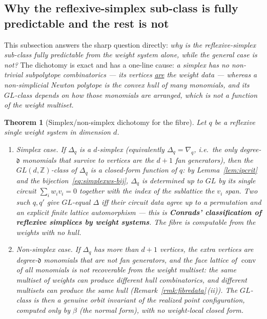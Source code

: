 \documentclass{amsart}
\newtheorem{theorem}{Theorem}[section]
\begin{document}
\subsection{Why the reflexive-simplex sub-class is fully predictable and
the rest is not}\label{sec:fibre-dichotomy}

This subsection answers the sharp question directly: \emph{why is the
reflexive-simplex sub-class fully predictable from the weight system alone,
while the general case is not?} The dichotomy is exact and has a one-line cause:
\emph{a simplex has no non-trivial subpolytope combinatorics --- its vertices
\underline{are} the weight data --- whereas a non-simplicial Newton polytope is
the convex hull of many monomials, and its $GL$-class depends on how those
monomials are arranged, which is not a function of the weight multiset.}

\begin{theorem}[Simplex/non-simplex dichotomy for the fibre]
\label{thm:dichotomy}
Let $q$ be a reflexive single weight system in dimension $d$.
\begin{enumerate}
  \item[\textnormal{(S)}] \emph{Simplex case.} If $\Delta_q$ is a $d$-simplex
        (equivalently $\Delta_q=\nabla_q$, i.e.\ the only degree-$\mathfrak d$
        monomials that survive to vertices are the $d{+}1$ fan generators), then
        the $GL(d,\mathbb Z)$-class of $\Delta_q$ is a \emph{closed-form
        function of $q$}: by Lemma~\ref{lem:ipcrit} and the
        bijection~\eqref{eq:simplexws-bij}, $\Delta_q$ is determined up to $GL$
        by its single circuit $\sum_i w_i v_i=0$ together with the index of the
        sublattice the $v_i$ span. Two such $q,q'$ give $GL$-equal $\Delta$ iff
        their circuit data agree up to a permutation and an explicit finite
        lattice automorphism --- this is \textbf{Conrads' classification of
        reflexive simplices by weight systems}. \emph{The fibre is computable
        from the weights with no hull.}
  \item[\textnormal{(N)}] \emph{Non-simplex case.} If $\Delta_q$ has more than
        $d{+}1$ vertices, the extra vertices are degree-$\mathfrak d$ monomials
        that are \emph{not} fan generators, and the face lattice of
        $\operatorname{conv}$ of all monomials is \emph{not} recoverable from the
        weight multiset: the same multiset of weights can produce different
        hull combinatorics, and different multisets can produce the same hull
        (Remark~\ref{rmk:fibredata}\,(ii)). The $GL$-class is then a genuine
        orbit invariant of the realized point configuration, computed only by
        $\beta$ (the normal form), with no weight-local closed form.
\end{enumerate}
\end{theorem}
\end{document}

